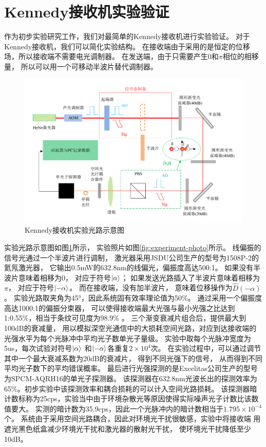 \section{Kennedy接收机实验验证}

作为初步实验研究工作，我们对最简单的Kennedy接收机进行实验验证。
对于Kennedy接收机，我们可以简化实验结构。
在接收端由于采用的是恒定的位移场，所以接收端不需要电光调制器。
在发送端，由于只需要产生$0$和$\pi$相位的相移量，
所以可以用一个可移动半波片替代调制器。




\begin{figure}
\centering
  \includegraphics[width=\textwidth]{figures/chap5/Kennedy-receiver-diagram}
  \caption{Kennedy接收机实验光路示意图}
  \label{fig:Kennedy-receiver-diagram}
\end{figure}

实验光路示意图如图\ref{fig:Kennedy-receiver-diagram}所示，
实验照片如图\ref{fig:experiment-photo}所示。
线偏振的信号光通过一个半波片进行调制，
激光器采用JSDU公司生产的型号为1508P-2的氦氖激光器，
它输出0.5mW的632.8nm的线偏光，偏振度高达500:1。 
如果没有半波片意味着相移为$0$，
对应于符号$\ket{\alpha}$；
如果发送光路插入了半波片意味着相移为$\pi$，
对应于符号$\ket{-\alpha}$。
而在接收端，没有加半波片，
意味着位移操作为$\hat{D}(-\alpha)$。
实验光路取夹角为45°，因此系统固有效率理论值为50\%。
通过采用一个偏振度高达1000:1的偏振分束器，
可以使得接收端最大光强与最小光强之比达到1:0.55\%，相当于条纹可见度为98.9\% 。
三个渐变衰减片组合后，提供最大到100dB的衰减量，
用以模拟深空光通信中的大损耗空间光路，对应到达接收端的光强水平为每个光脉冲中平均光子数单光子量级。
实验中取每个光脉冲宽度为5us，每次试验对符号$\ket{\alpha}$
和$\ket{-\alpha}$各重复$2\times 10^4$次。
在实验过程中，可以通过调节其中一个最大衰减系数为20dB的衰减片，
得到不同光强下的信号，
从而得到不同平均光子数下的平均错误概率。
最后进行光强探测的是Excelitas公司生产的型号为SPCM-AQRH16的单光子探测器。
该探测器在632.8nm光波长出的探测效率为65\%。初步实验中该探测效率和耦合损耗的可以计入空间光路损耗。
该探测器暗计数标称为25cps，实验当中由于环境杂散光等原因使得实际噪声光子计数比该数值要大。
实测的暗计数为35.9cps，因此一个光脉冲内的暗计数相当于$1.795\times 10^{-4}$个。
系统由于采用空间光路耦合，因此对环境光干扰很敏感，实验中将接收端
用遮光黑色纸盒减少环境光干扰和激光器的散射光干扰，
使环境光干扰降低至少10dB。


